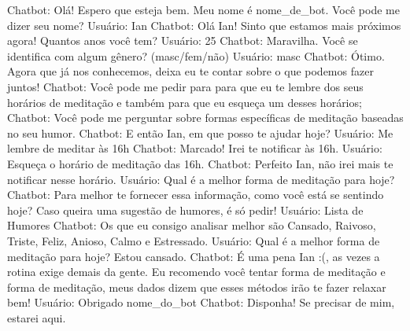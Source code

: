 Chatbot: Olá! Espero que esteja bem. Meu nome é {nome_de_bot}. Você pode me dizer seu nome?
Usuário: Ian
Chatbot: Olá Ian! Sinto que estamos mais próximos agora! Quantos anos você tem?
Usuário: 25
Chatbot: Maravilha. Você se identifica com algum gênero? (masc/fem/não)
Usuário: masc
Chatbot: Ótimo. Agora que já nos conhecemos, deixa eu te contar sobre o que podemos fazer juntos! 
Chatbot: Você pode me pedir para para que eu te lembre dos seus horários de meditação e também para que eu esqueça um desses horários;
Chatbot: Você pode me perguntar sobre formas específicas de meditação baseadas no seu humor.
Chatbot: E então Ian, em que posso te ajudar hoje?
Usuário: Me lembre de meditar às 16h
Chatbot: Marcado! Irei te notificar às 16h.
Usuário: Esqueça o horário de meditação das 16h.
Chatbot: Perfeito Ian, não irei mais te notificar nesse horário.
Usuário: Qual é a melhor forma de meditação para hoje?
Chatbot: Para melhor te fornecer essa informação, como você está se sentindo hoje? Caso queira uma sugestão de humores, é só pedir!
Usuário: Lista de Humores
Chatbot: Os que eu consigo analisar melhor são Cansado, Raivoso, Triste, Feliz, Anioso, Calmo e Estressado.
Usuário: Qual é a melhor forma de meditação para hoje? Estou cansado.
Chatbot: É uma pena Ian :(, as vezes a rotina exige demais da gente. Eu recomendo você tentar {forma de meditação} e {forma de meditação}, meus dados dizem que esses métodos irão te fazer relaxar bem!
Usuário: Obrigado {nome_do_bot}
Chatbot: Disponha! Se precisar de mim, estarei aqui.